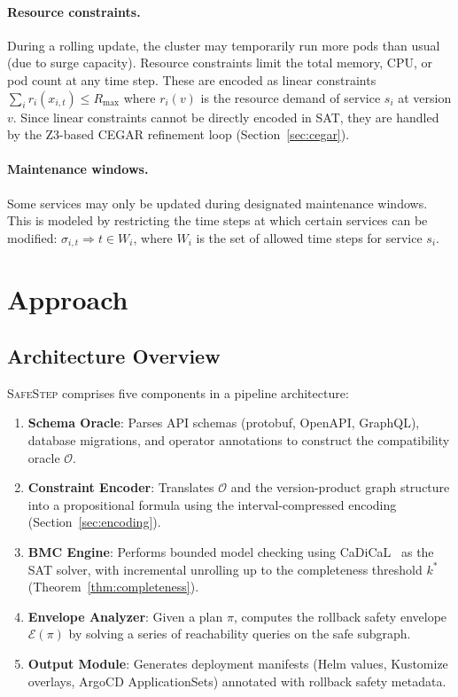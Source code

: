 \documentclass[10pt,twocolumn]{article}
\newcommand{\safestep}{\textsc{SafeStep}}
\begin{document}
\paragraph{Resource constraints.}
During a rolling update, the cluster may temporarily run more
pods than usual (due to surge capacity). Resource constraints
limit the total memory, CPU, or pod count at any time step.
These are encoded as linear constraints
$\sum_i r_i(x_{i,t}) \leq R_{\max}$ where $r_i(v)$ is the
resource demand of service $s_i$ at version $v$. Since linear
constraints cannot be directly encoded in SAT, they are handled
by the Z3-based CEGAR refinement loop
(Section~\ref{sec:cegar}).

\paragraph{Maintenance windows.}
Some services may only be updated during designated maintenance
windows. This is modeled by restricting the time steps at which
certain services can be modified:
$\sigma_{i,t} \Rightarrow t \in W_i$, where $W_i$ is the set
of allowed time steps for service $s_i$.

\section{Approach}
\label{sec:approach}

\subsection{Architecture Overview}

\safestep{} comprises five components in a pipeline
architecture:

\begin{enumerate}[leftmargin=*,nosep]
  \item \textbf{Schema Oracle}: Parses API schemas (protobuf,
    OpenAPI, GraphQL), database migrations, and operator
    annotations to construct the compatibility oracle
    $\mathcal{O}$.
  \item \textbf{Constraint Encoder}: Translates $\mathcal{O}$
    and the version-product graph structure into a
    propositional formula using the interval-compressed
    encoding (Section~\ref{sec:encoding}).
  \item \textbf{BMC Engine}: Performs bounded model checking
    using CaDiCaL~\cite{cadical} as the SAT solver, with
    incremental unrolling up to the completeness threshold
    $k^{*}$ (Theorem~\ref{thm:completeness}).
  \item \textbf{Envelope Analyzer}: Given a plan $\pi$, computes
    the rollback safety envelope $\mathcal{E}(\pi)$ by solving
    a series of reachability queries on the safe subgraph.
  \item \textbf{Output Module}: Generates deployment manifests
    (Helm values, Kustomize overlays, ArgoCD ApplicationSets)
    annotated with rollback safety metadata.
\end{enumerate}
\end{document}
